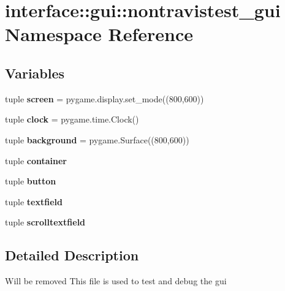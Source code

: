 \hypertarget{namespaceinterface_1_1gui_1_1nontravistest__gui}{\section{interface\-:\-:gui\-:\-:nontravistest\-\_\-gui \-Namespace \-Reference}
\label{namespaceinterface_1_1gui_1_1nontravistest__gui}
}
\subsection*{\-Variables}
\begin{DoxyCompactItemize}
\item 
\hypertarget{namespaceinterface_1_1gui_1_1nontravistest__gui_a6e57aec5278226236156987e3333d287}{tuple {\bfseries screen} = pygame.\-display.\-set\-\_\-mode((800,600))}\label{namespaceinterface_1_1gui_1_1nontravistest__gui_a6e57aec5278226236156987e3333d287}

\item 
\hypertarget{namespaceinterface_1_1gui_1_1nontravistest__gui_aea28ea04cbe69ed45f5db6cd4de589ed}{tuple {\bfseries clock} = pygame.\-time.\-Clock()}\label{namespaceinterface_1_1gui_1_1nontravistest__gui_aea28ea04cbe69ed45f5db6cd4de589ed}

\item 
\hypertarget{namespaceinterface_1_1gui_1_1nontravistest__gui_a4be26bd513a10d1598848b26cd58aef1}{tuple {\bfseries background} = pygame.\-Surface((800,600))}\label{namespaceinterface_1_1gui_1_1nontravistest__gui_a4be26bd513a10d1598848b26cd58aef1}

\item 
tuple {\bfseries container}
\item 
tuple {\bfseries button}
\item 
tuple {\bfseries textfield}
\item 
tuple {\bfseries scrolltextfield}
\end{DoxyCompactItemize}


\subsection{\-Detailed \-Description}
\begin{DoxyVerb}Will be removed
    This file is used to test and debug the gui\end{DoxyVerb}
 

